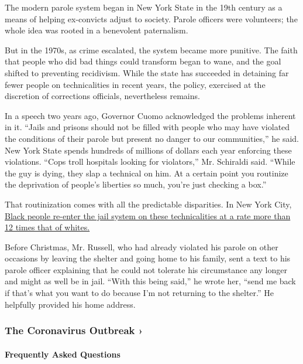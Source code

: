 The modern parole system began in New York State in the 19th century as
a means of helping ex-convicts adjust to society. Parole officers were
volunteers; the whole idea was rooted in a benevolent paternalism.

But in the 1970s, as crime escalated, the system became more punitive.
The faith that people who did bad things could transform began to wane,
and the goal shifted to preventing recidivism. While the state has
succeeded in detaining far fewer people on technicalities in recent
years, the policy, exercised at the discretion of corrections officials,
nevertheless remains.

In a speech two years ago, Governor Cuomo acknowledged the problems
inherent in it. ``Jails and prisons should not be filled with people who
may have violated the conditions of their parole but present no danger
to our communities,'' he said. New York State spends hundreds of
millions of dollars each year enforcing these violations. ``Cops troll
hospitals looking for violators,'' Mr. Schiraldi said. ``While the guy
is dying, they slap a technical on him. At a certain point you routinize
the deprivation of people's liberties so much, you're just checking a
box.''

That routinization comes with all the predictable disparities. In New
York City, \href{https://www.katalcenter.org/lessismoreny}{Black people
re-enter the jail system on these technicalities at a rate more than 12
times that of whites.}

Before Christmas, Mr. Russell, who had already violated his parole on
other occasions by leaving the shelter and going home to his family,
sent a text to his parole officer explaining that he could not tolerate
his circumstance any longer and might as well be in jail. ``With this
being said,'' he wrote her, ``send me back if that's what you want to do
because I'm not returning to the shelter.'' He helpfully provided his
home address.

\href{https://www.nytimes3xbfgragh.onion/news-event/coronavirus?action=click\&pgtype=Article\&state=default\&region=MAIN_CONTENT_3\&context=storylines_faq}{}

\hypertarget{the-coronavirus-outbreak-}{%
\subsubsection{The Coronavirus Outbreak
›}\label{the-coronavirus-outbreak-}}

\hypertarget{frequently-asked-questions}{%
\paragraph{Frequently Asked
Questions}\label{frequently-asked-questions}}

